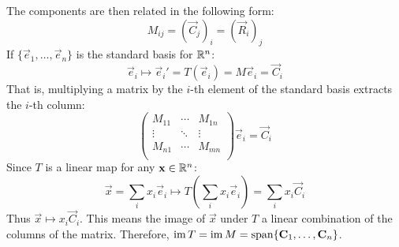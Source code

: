 \documentclass[../main.tex]{subfiles}
\begin{document}
The components are then related in the following form:
\[
  M_{i j} = (\vec{C}_j)_i = (\vec{R}_i)_j
\]
If $\{\vec{e}_1, \ldots, \vec{e}_n\}$ is the standard basis for $\mathbb{R}^{n}$:
\[
  \vec{e}_i \mapsto \vec{e}_i' = T(\vec{e}_i) = M\vec{e}_i = \vec{C}_i
\]
That is, multiplying a matrix by the $i$-th element of the standard basis extracts the $i$-th column:
\[
  \begin{pmatrix}
  M_{1 1} & \cdots & M_{1 n} \\
  \vdots & \ddots & \vdots \\
  M_{n 1} & \cdots & M_{m n} \\
  \end{pmatrix}
  \vec{e}_i = \vec{C}_i
\]
Since $T$ is a linear map for any $\mathbf{\bm{x}} \in \mathbb{R}^{n}$:
\[
  \vec{x} = \sum_{i} x_i \vec{e}_i \mapsto T\left(\sum_{i} x_i \vec{e}_i \right) = \sum_{i} x_i \vec{C}_i
\]
Thus $\vec{x} \mapsto x_i \vec{C}_i$.
This means the image of $\vec{x}$ under $T$ a linear combination of the columns of the matrix.
Therefore, $\operatorname{im} T = \operatorname{im} M = \operatorname{span}\{\mathbf{\bm{C}}_1, \ldots, \mathbf{\bm{C}}_n\}$.
\end{document}

